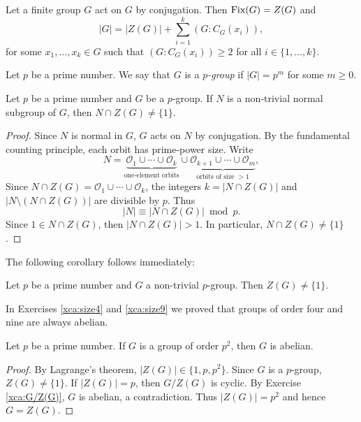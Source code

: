 \begin{example}
Let a finite group $G$ act on $G$ by conjugation. 
Then $\operatorname{Fix}(G)=Z(G)$ and 
\[
|G|=|Z(G)|+\sum_{i=1}^k(G:C_G(x_i)),
\]
for some $x_1,\dots,x_k\in G$ such that 
$(G:C_G(x_i))\geq2$ for all $i\in\{1,\dots,k\}$.
\end{example}

\begin{definition}
Let $p$ be a prime number. We say 
that $G$ is a \emph{$p$-group} if $|G|=p^m$ for some $m\geq0$.
\end{definition}

\begin{theorem}
Let $p$ be a prime number and 
$G$ be a $p$-group. If $N$ is a non-trivial normal subgroup of $G$, then
$N\cap Z(G)\ne\{1\}$.
\end{theorem}

\begin{proof}
Since $N$ is normal in $G$, $G$ acts on $N$ by conjugation. 
By the fundamental counting principle,
each orbit has prime-power size. Write 
\[
N=\underbrace{\mathcal{O}_1\cup\cdots\cup \mathcal{O}_k}_{\text{one-element orbits}}\cup\underbrace{\mathcal{O}_{k+1}\cup\cdots\cup\mathcal{O}_m}_{\text{orbits of size $>1$}},
\]
Since $N\cap Z(G)=\mathcal{O}_1\cup\cdots\cup\mathcal{O}_k$, 
the integers $k=|N\cap Z(G)|$ and $|N\setminus(N\cap Z(G))|$ are divisible by $p$. Thus 
\[
|N|\equiv|N\cap Z(G)|\bmod p.
\]
Since $1\in N\cap Z(G)$, then
$|N\cap Z(G)|>1$. In particular, $N\cap Z(G)\ne\{1\}$.
\end{proof}

The following corollary follows immediately: 

\begin{corollary}
Let $p$ be a prime number and 
$G$ a non-trivial $p$-group. Then 
$Z(G)\ne\{1\}$.
\end{corollary}

In Exercises \ref{xca:size4} and \ref{xca:size9}
we proved that groups of order four and nine are always abelian. 

\begin{corollary}
    Let $p$ be a prime number. If $G$ is a group of order $p^2$, 
    then $G$ is abelian. 
\end{corollary}

\begin{proof}
By Lagrange's theorem, $|Z(G)|\in\{1,p,p^2\}$. Since $G$ 
is a $p$-group, $Z(G)\ne\{1\}$. If $|Z(G)|=p$, then $G/Z(G)$ 
is cyclic. By Exercise \ref{xca:G/Z(G)}, 
$G$ is abelian, a contradiction. 
Thus $|Z(G)|=p^2$ and hence $G=Z(G)$.
\end{proof}

